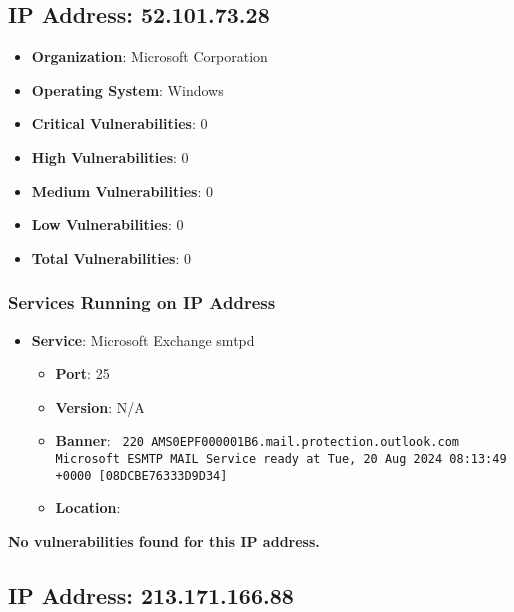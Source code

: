 \documentclass{article}
\begin{document}
\subsection*{IP Address: 52.101.73.28}

\begin{itemize}
    \item \textbf{Organization}: Microsoft Corporation
    \item \textbf{Operating System}:  Windows 
    \item \textbf{Critical Vulnerabilities}: 0
    \item \textbf{High Vulnerabilities}: 0
    \item \textbf{Medium Vulnerabilities}: 0
    \item \textbf{Low Vulnerabilities}: 0
    \item \textbf{Total Vulnerabilities}: 0
\end{itemize}

\subsubsection*{Services Running on IP Address}

\begin{itemize}
    
        \item \textbf{Service}: Microsoft Exchange smtpd
        \begin{itemize}
            \item \textbf{Port}: 25
            \item \textbf{Version}:  N/A 
            \item \textbf{Banner}: \texttt{ 220 AMS0EPF000001B6.mail.protection.outlook.com Microsoft ESMTP MAIL Service ready at Tue, 20 Aug 2024 08:13:49 +0000 [08DCBE76333D9D34]
 }
            \item \textbf{Location}: \href{  }{  }
        \end{itemize}
    
\end{itemize}


\textbf{No vulnerabilities found for this IP address.}


\clearpage



\subsection*{IP Address: 213.171.166.88}
\end{document}

